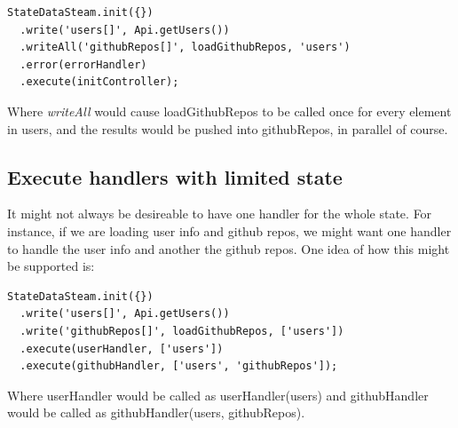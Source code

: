 \documentclass[a4paper,12pt]{article}
\begin{document}
\begin{lstlisting}[caption=Executing the stream, frame=single]
StateDataSteam.init({})
  .write('users[]', Api.getUsers())
  .writeAll('githubRepos[]', loadGithubRepos, 'users')
  .error(errorHandler)
  .execute(initController);
\end{lstlisting}
Where \emph{writeAll} would cause loadGithubRepos to be called once for every element in users, and the results would be pushed into githubRepos, in parallel of course.

\subsection{Execute handlers with limited state}
It might not always be desireable to have one handler for the whole state. For instance, if we are loading user info and github repos, we might want one handler to
handle the user info and another the github repos. One idea of how this might be supported is:

\begin{lstlisting}[caption=Executing the stream, frame=single]
StateDataSteam.init({})
  .write('users[]', Api.getUsers())
  .write('githubRepos[]', loadGithubRepos, ['users'])
  .execute(userHandler, ['users'])
  .execute(githubHandler, ['users', 'githubRepos']);
\end{lstlisting}

Where userHandler would be called as userHandler(users) and githubHandler would be called as githubHandler(users, githubRepos).
\end{document}
